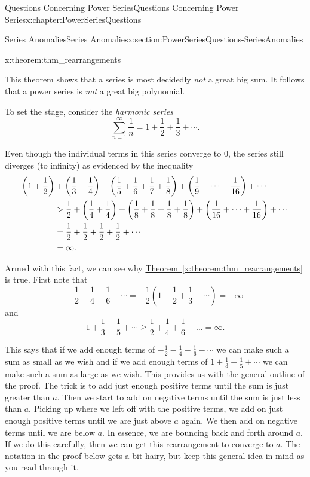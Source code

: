 \begin{chapterptx}{Questions Concerning Power Series}{}{Questions Concerning Power Series}{}{}{x:chapter:PowerSeriesQuestions}
\begin{sectionptx}{Series Anomalies}{}{Series Anomalies}{}{}{x:section:PowerSeriesQuestions-SeriesAnomalies}
\begin{theorem}{}{}{x:theorem:thm_rearrangements}
		\end{theorem}
		This theorem shows that a series is most decidedly \emph{not} a great big sum. It follows that a power series is \emph{not} a great big polynomial.%
		\par
		To set the stage, consider the \emph{harmonic series} %
		\begin{equation*}
			\sum_{n=1}^\infty\frac{1}{n}=1+\frac{1}{2}+\frac{1}{3}+\cdots\text{.}
		\end{equation*}
		\par
		Even though the individual terms in this series converge to \(0\), the series still diverges (to infinity) as evidenced by the inequality%
		\begin{align*}
			\left(1+\frac{1}{2}\right)& +\left(\frac{1}{3}+\frac{1}{4}\right)+\left(\frac{1}{5}+\frac{1}{6}+ \frac{1}{7}+\frac{1}{8}\right)+\left(\frac{1}{9}+\cdots+\frac{1}{16}\right)+\cdots\\
			& >\frac{1}{2}+\left(\frac{1}{4}+\frac{1}{4}\right)+\left(\frac{1}{8}+ \frac{1}{8}+\frac{1}{8}+\frac{1}{8}\right)+\left(\frac{1}{16}+\cdots+\frac{1}{16}\right)+\cdots\\
			& =\frac{1}{2}+\frac{1}{2}+\frac{1}{2}+\frac{1}{2}+\cdots\\
			& =   \infty\text{.}
		\end{align*}
		\par
		Armed with this fact, we can see why \hyperref[x:theorem:thm_rearrangements]{Theorem~{\xreffont\ref{x:theorem:thm_rearrangements}}} is true. First note that%
		\begin{equation*}
			-\frac{1}{2}-\frac{1}{4}-\frac{1}{6}-\cdots=-\frac{1}{2}(1+\frac{1}{2}+ \frac{1}{3}+\cdots)=-\infty
		\end{equation*}
		and%
		\begin{equation*}
			1+\frac{1}{3}+\frac{1}{5}+\cdots\geq\frac{1}{2}+\frac{1}{4}+\frac{1}{6}+\ldots= \infty\text{.}
		\end{equation*}
		\par
		This says that if we add enough terms of \(-\frac{1}{2}-\frac{1}{4}-\frac{1}{6}-\cdots\) we can make such a sum as small as we wish and if we add enough terms of \(1+\frac{1}{3}+\frac{1}{5}+\cdots\) we can make such a sum as large as we wish. This provides us with the general outline of the proof. The trick is to add just enough positive terms until the sum is just greater than \(a\). Then we start to add on negative terms until the sum is just less than \(a\). Picking up where we left off with the positive terms, we add on just enough positive terms until we are just above \(a\) again. We then add on negative terms until we are below \(a\). In essence, we are bouncing back and forth around \(a\). If we do this carefully, then we can get this rearrangement to converge to \(a\). The notation in the proof below gets a bit hairy, but keep this general idea in mind as you read through it.%

\end{sectionptx}
\end{chapterptx}
